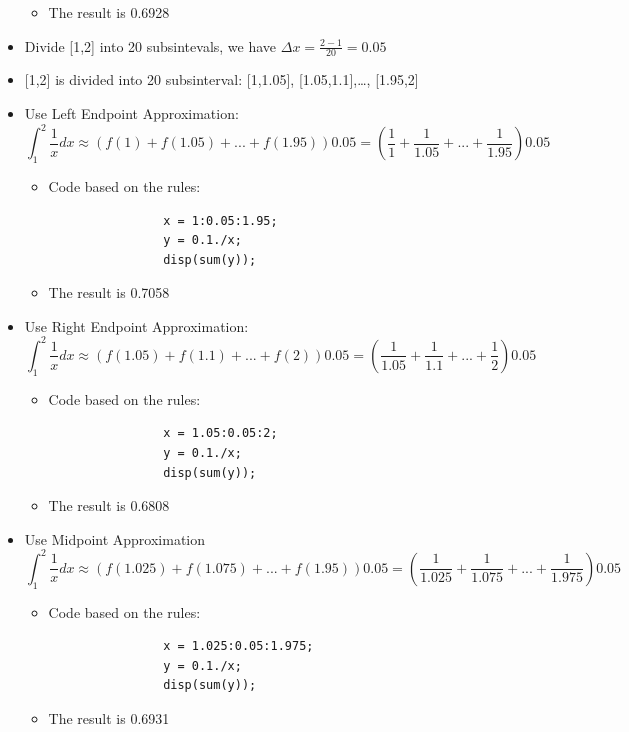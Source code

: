 \documentclass[12pt,en,a4paper]{article}
\begin{document}
\begin{itemize}
\begin{itemize}
\begin{mdframed}[hidealllines=true,backgroundcolor=magenta!10]
			\end{mdframed}
			\item The result is 0.6928
		\end{itemize}
		\item Divide [1,2] into 20 subsintevals, we have \(\Delta x=\frac{2-1}{20}=0.05\)
		\item {[1,2]} is divided into 20 subsinterval: [1,1.05], [1.05,1.1],…, [1.95,2]
		\item Use Left Endpoint Approximation:
		\[\int_{1}^{2}\frac{1}{x}dx\approx (f(1)+f(1.05)+...+f(1.95))0.05=(\frac{1}{1}+\frac{1}{1.05}+...+\frac{1}{1.95})0.05\]
		\begin{itemize}
			\item Code based on the rules:\\
			\begin{mdframed}[hidealllines=true,backgroundcolor=magenta!10]
				\begin{lstlisting}
				x = 1:0.05:1.95;
				y = 0.1./x;
				disp(sum(y));
				\end{lstlisting}
			\end{mdframed}
			\item The result is 0.7058
		\end{itemize}
		\item Use Right Endpoint Approximation:
		\[\int_{1}^{2}\frac{1}{x}dx\approx (f(1.05)+f(1.1)+...+f(2))0.05=(\frac{1}{1.05}+\frac{1}{1.1}+...+\frac{1}{2})0.05\]
		\begin{itemize}
			\item Code based on the rules:\\
			\begin{mdframed}[hidealllines=true,backgroundcolor=magenta!10]
				\begin{lstlisting}
				x = 1.05:0.05:2;
				y = 0.1./x;
				disp(sum(y));
				\end{lstlisting}
			\end{mdframed}
			\item The result is 0.6808
		\end{itemize}
		\item Use Midpoint Approximation
		\[\int_{1}^{2}\frac{1}{x}dx\approx (f(1.025)+f(1.075)+...+f(1.95))0.05=(\frac{1}{1.025}+\frac{1}{1.075}+...+\frac{1}{1.975})0.05\]
		\begin{itemize}
			\item Code based on the rules:\\
			\begin{mdframed}[hidealllines=true,backgroundcolor=magenta!10]
				\begin{lstlisting}
				x = 1.025:0.05:1.975;
				y = 0.1./x;
				disp(sum(y));
				\end{lstlisting}
			\end{mdframed}
			\item The result is 0.6931
		\end{itemize}
	\end{itemize}
\end{document}
